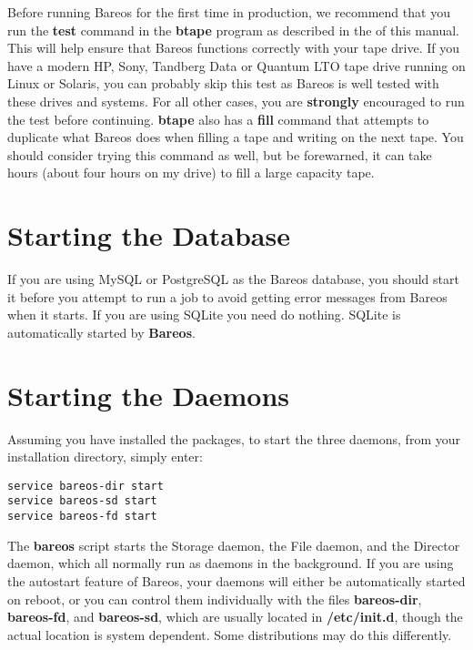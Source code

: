 Before running Bareos for the first time in production, we recommend that you
run the {\bf test} command in the {\bf btape} program as described in the
 of this manual. This will
help ensure that Bareos functions correctly with your tape drive. If you have
a modern HP, Sony, Tandberg Data or Quantum LTO tape drive running on Linux or
Solaris, you can probably skip this test as Bareos is well tested with these
drives and systems. For all other cases, you are {\bf strongly} encouraged to
run the test before continuing. {\bf btape} also has a {\bf fill} command that
attempts to duplicate what Bareos does when filling a tape and writing on the
next tape. You should consider trying this command as well, but be forewarned,
it can take hours (about four hours on my drive) to fill a large capacity tape.

\section{Starting the Database}
\label{StartDB}

If you are using MySQL or PostgreSQL as the Bareos database, you should start
it before you attempt to run a job to avoid getting error messages from Bareos
when it starts.
If you are using SQLite you need do nothing. SQLite is automatically
started by {\bf Bareos}.

\section{Starting the Daemons}
\label{StartDaemon}

Assuming you have installed the packages,
to start the three daemons, from your installation directory, simply enter:

\begin{verbatim}
service bareos-dir start
service bareos-sd start
service bareos-fd start
\end{verbatim}

The {\bf bareos} script starts the Storage daemon, the File daemon, and the
Director daemon, which all normally run as daemons in the background. If you
are using the autostart feature of Bareos, your daemons will either be
automatically started on reboot, or you can control them individually with the
files {\bf bareos-dir}, {\bf bareos-fd}, and {\bf bareos-sd}, which are
usually located in {\bf /etc/init.d}, though the actual location is system
dependent.
Some distributions may do this differently.

